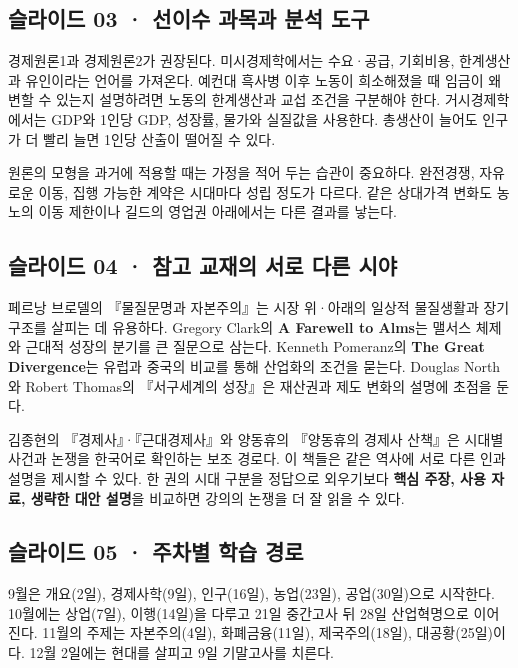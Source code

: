 \documentclass[10pt,a4paper]{article}
\begin{document}
\subsection{슬라이드 03 · 선이수 과목과 분석 도구}
경제원론1과 경제원론2가 권장된다. 미시경제학에서는 수요·공급, 기회비용, 한계생산과 유인이라는 언어를 가져온다. 예컨대 흑사병 이후 노동이 희소해졌을 때 임금이 왜 변할 수 있는지 설명하려면 노동의 한계생산과 교섭 조건을 구분해야 한다. 거시경제학에서는 GDP와 1인당 GDP, 성장률, 물가와 실질값을 사용한다. 총생산이 늘어도 인구가 더 빨리 늘면 1인당 산출이 떨어질 수 있다.\par

원론의 모형을 과거에 적용할 때는 가정을 적어 두는 습관이 중요하다. 완전경쟁, 자유로운 이동, 집행 가능한 계약은 시대마다 성립 정도가 다르다. 같은 상대가격 변화도 농노의 이동 제한이나 길드의 영업권 아래에서는 다른 결과를 낳는다.\par

\subsection{슬라이드 04 · 참고 교재의 서로 다른 시야}
페르낭 브로델의 『물질문명과 자본주의』는 시장 위·아래의 일상적 물질생활과 장기 구조를 살피는 데 유용하다. Gregory Clark의 \textbf{A Farewell to Alms}는 맬서스 체제와 근대적 성장의 분기를 큰 질문으로 삼는다. Kenneth Pomeranz의 \textbf{The Great Divergence}는 유럽과 중국의 비교를 통해 산업화의 조건을 묻는다. Douglas North와 Robert Thomas의 『서구세계의 성장』은 재산권과 제도 변화의 설명에 초점을 둔다.\par

김종현의 『경제사』·『근대경제사』와 양동휴의 『양동휴의 경제사 산책』은 시대별 사건과 논쟁을 한국어로 확인하는 보조 경로다. 이 책들은 같은 역사에 서로 다른 인과 설명을 제시할 수 있다. 한 권의 시대 구분을 정답으로 외우기보다 \textbf{핵심 주장, 사용 자료, 생략한 대안 설명}을 비교하면 강의의 논쟁을 더 잘 읽을 수 있다.\par

\subsection{슬라이드 05 · 주차별 학습 경로}
9월은 개요(2일), 경제사학(9일), 인구(16일), 농업(23일), 공업(30일)으로 시작한다. 10월에는 상업(7일), 이행(14일)을 다루고 21일 중간고사 뒤 28일 산업혁명으로 이어진다. 11월의 주제는 자본주의(4일), 화폐금융(11일), 제국주의(18일), 대공황(25일)이다. 12월 2일에는 현대를 살피고 9일 기말고사를 치른다.\par
\end{document}
